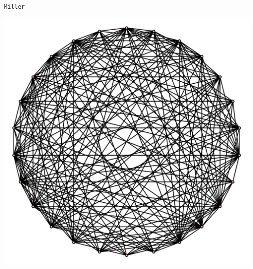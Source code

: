 \documentclass{article}
\newcommand{\puzzleTitle}[1]{
\begin{center}
{\Large \texttt{#1}}
\end{center}
}
\begin{document}
\newpage

\puzzleTitle{Miller}

\vfill

\begin{center}
\includegraphics[width=\linewidth]{early-drafts/IndependentSet26.png}
\end{center}

\vfill

\newpage
\end{document}
